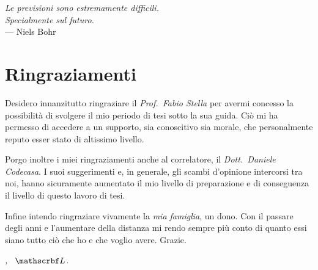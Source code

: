 
\cleardoublepage
{}
{}

\begin{flushright}{\slshape
	Le previsioni sono estremamente difficili. \\
	Specialmente sul futuro.} \\\medskip
    --- Niels Bohr
\end{flushright}

\bigskip

\begingroup
\let\clearpage\relax
\let\cleardoublepage\relax
\let\cleardoublepage\relax

\chapter*{Ringraziamenti}

Desidero innanzitutto ringraziare il \emph{Prof.~Fabio Stella} per avermi concesso la possibilità di svolgere il mio periodo di tesi sotto la sua guida. Ciò mi ha permesso di accedere a un supporto, sia conoscitivo sia morale, che personalmente reputo esser stato di altissimo livello.

Porgo inoltre i miei ringraziamenti anche al correlatore, il \emph{Dott.~Daniele Codecasa}. I suoi suggerimenti e, in generale, gli scambi d'opinione intercorsi tra noi, hanno sicuramente aumentato il mio livello di preparazione e di conseguenza il livello di questo lavoro di tesi.

Infine intendo ringraziare vivamente la \emph{mia famiglia}, un dono. Con il passare degli anni e l'aumentare della distanza mi rendo sempre più conto di quanto essi siano tutto ciò che ho e che voglio avere. Grazie.

\bigskip

\noindent\textit{\mylocation, \MakeTextLowercase{\mytime}}
\hfill ~$\myinitial$.
\endgroup

